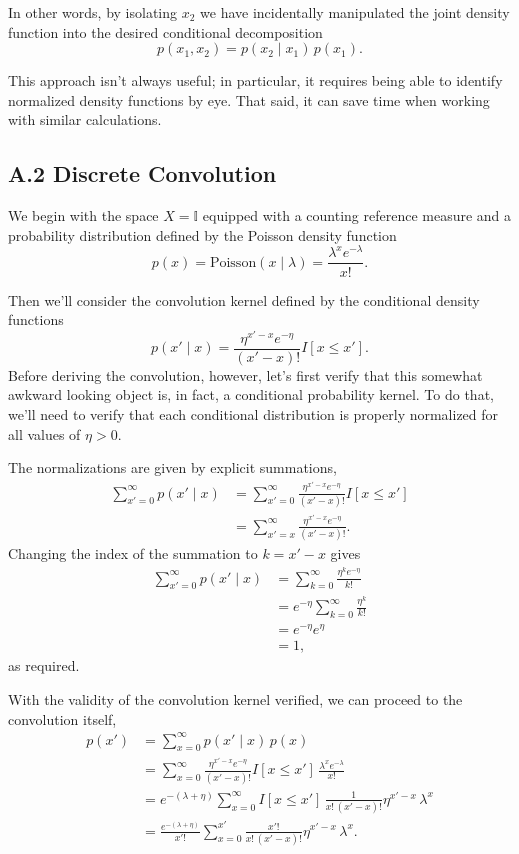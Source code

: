 \documentclass[
  letterpaper,
  DIV=11,
  numbers=noendperiod]{scrartcl}
\begin{document}
In other words, by isolating \(x_{2}\) we have incidentally manipulated
the joint density function into the desired conditional decomposition \[
p( x_{1}, x_{2} )
=
p( x_{2} \mid x_{1} ) \, p( x_{1} ).
\]

This approach isn't always useful; in particular, it requires being able
to identify normalized density functions by eye. That said, it can save
time when working with similar calculations.

\subsection*{A.2 Discrete Convolution}\label{sec:app2}

We begin with the space \(X = \mathbb{I}\) equipped with a counting
reference measure and a probability distribution defined by the Poisson
density function \[
p( x )
= \text{Poisson}( x \mid \lambda )
= \frac{ \lambda^{x} e^{-\lambda} }{ x! }.
\]

Then we'll consider the convolution kernel defined by the conditional
density functions \[
p( x' \mid x )
=
\frac{ \eta^{x' - x} e^{-\eta} }{ (x' - x)! } I[ x \le x' ].
\] Before deriving the convolution, however, let's first verify that
this somewhat awkward looking object is, in fact, a conditional
probability kernel. To do that, we'll need to verify that each
conditional distribution is properly normalized for all values of
\(\eta > 0\).

The normalizations are given by explicit summations, \begin{align*}
\sum_{x' = 0}^{ \infty }
p( x' \mid x )
&=
\sum_{x' = 0}^{ \infty }
\frac{ \eta^{x' - x} e^{-\eta} }{ (x' - x)! } I[ x \le x' ]
\\
&=
\sum_{x' = x}^{ \infty }
\frac{ \eta^{x' - x} e^{-\eta} }{ (x' - x)! }.
\end{align*} Changing the index of the summation to \(k = x' - x\) gives
\begin{align*}
\sum_{x' = 0}^{ \infty }
p( x' \mid x )
&=
\sum_{k = 0}^{ \infty }
\frac{ \eta^{k} e^{-\eta} }{ k! }
\\
&=
e^{-\eta}
\sum_{k = 0}^{ \infty }
\frac{ \eta^{k} }{ k! }
\\
&=
e^{-\eta}
e^{\eta}
\\
&=
1,
\end{align*} as required.

With the validity of the convolution kernel verified, we can proceed to
the convolution itself, \begin{align*}
p ( x' )
&=
\sum_{x = 0}^{ \infty }
p( x' \mid x ) \, p (x)
\\
&=
\sum_{x = 0}^{ \infty }
\frac{ \eta^{x' - x} e^{-\eta} }{ (x' - x)! } I[ x \le x' ] \,
\frac{ \lambda^{x} e^{-\lambda} }{ x! }
\\
&=
e^{-(\lambda + \eta)}
\sum_{x = 0}^{ \infty }
I[ x \le x' ] \,
\frac{ 1 }{ x! \, (x' - x)! }
\eta^{x' - x} \, \lambda^{x}
\\
&=
\frac{ e^{-(\lambda + \eta)} }{ x'! }
\sum_{x = 0}^{ x' }
\frac{ x'! }{ x! \, (x' - x)! }
\eta^{x' - x} \, \lambda^{x}.
\end{align*}
\end{document}
